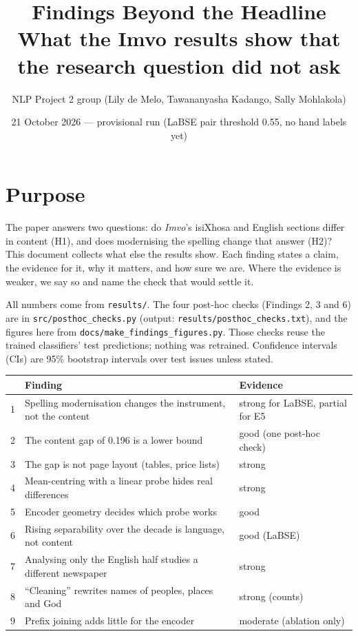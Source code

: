 \documentclass[11pt,a4paper]{article}
\title{Findings Beyond the Headline\\[4pt] \large What the Imvo results show that the research question did not ask}
\author{NLP Project 2 group (Lily de Melo, Tawananyasha Kadango, Sally Mohlakola)}
\date{21 October 2026 --- provisional run (LaBSE pair threshold 0.55, no hand labels yet)}
\begin{document}
\maketitle

\section*{Purpose}
The paper answers two questions: do \emph{Imvo}'s isiXhosa and English sections differ in content (H1), and
does modernising the spelling change that answer (H2)? This document collects what else the results
show. Each finding states a claim, the evidence for it, why it matters, and how sure we are. Where the
evidence is weaker, we say so and name the check that would settle it.

All numbers come from \texttt{results/}. The four post-hoc checks (Findings 2, 3 and 6) are in
\texttt{src/posthoc\_checks.py} (output: \texttt{results/posthoc\_checks.txt}), and the figures here from
\texttt{docs/make\_findings\_figures.py}. Those checks reuse the trained classifiers' test predictions; nothing
was retrained. Confidence intervals (CIs) are 95\% bootstrap intervals over test issues unless stated.

\begin{table}[h]
\centering\small
\begin{tabularx}{\linewidth}{@{}clX@{}}
\toprule
& Finding & Evidence \\
\midrule
1 & Spelling modernisation changes the instrument, not the content & strong for LaBSE, partial for E5 \\
2 & The content gap of 0.196 is a lower bound & good (one post-hoc check) \\
3 & The gap is not page layout (tables, price lists) & strong \\
4 & Mean-centring with a linear probe hides real differences & strong \\
5 & Encoder geometry decides which probe works & good \\
6 & Rising separability over the decade is language, not content & good (LaBSE) \\
7 & Analysing only the English half studies a different newspaper & strong \\
8 & ``Cleaning'' rewrites names of peoples, places and God & strong (counts) \\
9 & Prefix joining adds little for the encoder & moderate (ablation only) \\
\bottomrule
\end{tabularx}
\end{table}
\end{document}
